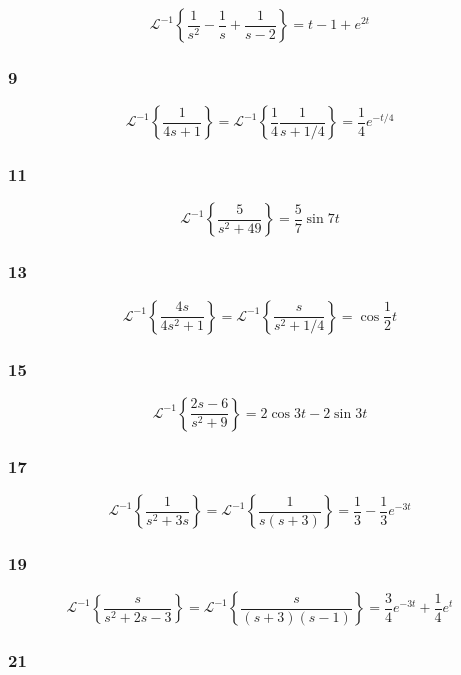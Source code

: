 \documentclass{article}
\begin{document}
\[\mathcal{L}^{-1} \left\{ \frac{1}{s^2} - \frac{1}{s} + \frac{1}{s - 2} \right\} = t - 1 + e^{2 t}\]

\subsubsection{9}

\[\mathcal{L}^{-1} \left\{ \frac{1}{4 s + 1} \right\} = \mathcal{L}^{-1} \left\{ \frac{1}{4} \frac{1}{s + 1 / 4} \right\} = \frac{1}{4} e^{-t / 4}\]

\subsubsection{11}

\[\mathcal{L}^{-1} \left\{ \frac{5}{s^2 + 49} \right\} = \frac{5}{7} \sin 7 t\]

\subsubsection{13}

\[\mathcal{L}^{-1} \left\{ \frac{4 s}{4 s^2 + 1} \right\} = \mathcal{L}^{-1} \left\{ \frac{s}{s^2 + 1 / 4} \right\} = \cos \frac{1}{2} t\]

\subsubsection{15}

\[\mathcal{L}^{-1} \left\{ \frac{2 s - 6}{s^2 + 9} \right\} = 2 \cos 3 t - 2 \sin 3 t\]

\subsubsection{17}

\[\mathcal{L}^{-1} \left\{ \frac{1}{s^2 + 3 s} \right\} = \mathcal{L}^{-1} \left\{ \frac{1}{s (s + 3)} \right\} = \frac{1}{3} - \frac{1}{3} e^{-3 t}\]

\subsubsection{19}

\[\mathcal{L}^{-1} \left\{ \frac{s}{s^2 + 2 s - 3} \right\} = \mathcal{L}^{-1} \left\{ \frac{s}{(s + 3) (s - 1)} \right\} = \frac{3}{4} e^{-3 t} + \frac{1}{4} e^t\]

\subsubsection{21}
\end{document}
